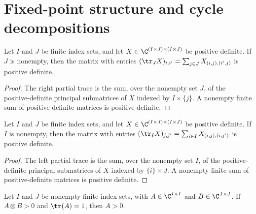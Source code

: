\section{Fixed-point structure and cycle decompositions}

\begin{theorem}
    \label{thm:posdef_partial_trace_right}
    \leanok
    Let $I$ and $J$ be finite index sets, and let
    $X\in\C^{(I\times J)\times(I\times J)}$ be positive definite.
    If $J$ is nonempty, then the matrix with entries
    $(\tr_J X)_{i,i'}=\sum_{j\in J}X_{(i,j),(i',j)}$ is positive definite.
\end{theorem}

\begin{proof}
    \leanok
    The right partial trace is the sum, over the nonempty set $J$, of the
    positive-definite principal submatrices of $X$ indexed by
    $I\times\{j\}$. A nonempty finite sum of positive-definite matrices is
    positive definite.
\end{proof}

\begin{theorem}
    \label{thm:posdef_partial_trace_left}
    \leanok
    Let $I$ and $J$ be finite index sets, and let
    $X\in\C^{(I\times J)\times(I\times J)}$ be positive definite.
    If $I$ is nonempty, then the matrix with entries
    $(\tr_I X)_{j,j'}=\sum_{i\in I}X_{(i,j),(i,j')}$ is positive definite.
\end{theorem}

\begin{proof}
    \leanok
    The left partial trace is the sum, over the nonempty set $I$, of the
    positive-definite principal submatrices of $X$ indexed by
    $\{i\}\times J$. A nonempty finite sum of positive-definite matrices is
    positive definite.
\end{proof}

\begin{theorem}
    \label{thm:posdef_left_kronecker_trace_one}
    \leanok
    Let $I$ and $J$ be nonempty finite index sets, with
    $A\in\C^{I\times I}$ and $B\in\C^{J\times J}$. If $A\otimes B>0$ and
    $\tr(A)=1$, then $A>0$.
\end{theorem}

